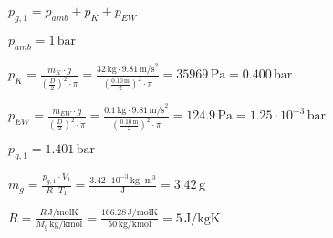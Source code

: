 \( p_{g,1} = p_{amb} + p_{K} + p_{EW} \)  

\( p_{amb} = 1 \, \text{bar} \)  

\( p_{K} = \frac{m_K \cdot g}{\left(\frac{D}{2}\right)^2 \cdot \pi} = \frac{32 \, \text{kg} \cdot 9.81 \, \text{m/s}^2}{\left(\frac{0.10 \, \text{m}}{2}\right)^2 \cdot \pi} = 35969 \, \text{Pa} = 0.400 \, \text{bar} \)  

\( p_{EW} = \frac{m_{EW} \cdot g}{\left(\frac{D}{2}\right)^2 \cdot \pi} = \frac{0.1 \, \text{kg} \cdot 9.81 \, \text{m/s}^2}{\left(\frac{0.10 \, \text{m}}{2}\right)^2 \cdot \pi} = 124.9 \, \text{Pa} = 1.25 \cdot 10^{-3} \, \text{bar} \)  

\( p_{g,1} = 1.401 \, \text{bar} \)  

\( m_g = \frac{p_{g,1} \cdot V_1}{R \cdot T_1} = \frac{3.42 \cdot 10^{-3} \, \text{kg} \cdot \text{m}^3}{\text{J}} = 3.42 \, \text{g} \)  

\( R = \frac{R \, \text{J/molK}}{M_g \, \text{kg/kmol}} = \frac{166.28 \, \text{J/molK}}{50 \, \text{kg/kmol}} = 5 \, \text{J/kgK} \)